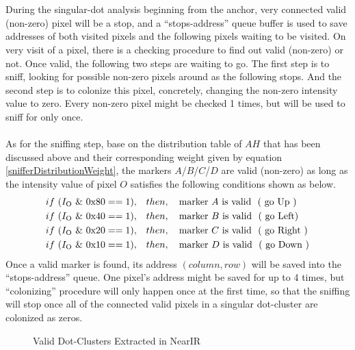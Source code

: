 \\\\%
During the singular-dot analysis beginning from the anchor, very connected valid (non-zero) pixel will be a stop, and a \enquote{stops-address} queue buffer is used to save addresses of both visited pixels and the following pixels waiting to be visited. On very visit of a pixel, there is a checking procedure to find out valid (non-zero) or not. Once valid, the following two steps are waiting to go. The first step is to sniff, looking for possible non-zero pixels around as the following stops. And the second step is to colonize this pixel, concretely, changing the non-zero intensity value to zero. Every non-zero pixel might be checked 1 times, but will be used to sniff for only once.%
\\\\%
As for the sniffing step, base on the distribution table of \(A\)\texttildelow \(H\) that has been discussed above and their corresponding weight given by equation \ref{snifferDistributionWeight}, the markers \(A\)/\(B\)/\(C\)/\(D\) are valid (non-zero) as long as the intensity value of pixel \(O\) satisfies the following conditions shown as below.%
%
\begin{equation}
%
\begin{aligned}
if \,\, ( I_{\text{O}} \,\, \& \,\, \text{0x80}  == 1 ),\quad &then, \quad \text{marker } A\,\, \text{is valid \,\,( go Up )}%
\\%
if \,\, ( I_{\text{O}} \,\, \& \,\, \text{0x40}  == 1 ),\quad &then, \quad \text{marker } B\,\, \text{is valid \,\,( go  Left)}%
\\%
if \,\, ( I_{\text{O}} \,\, \& \,\, \text{0x20}  == 1 ),\quad &then, \quad \text{marker } C\,\,\text{is valid \,\,( go Right )}%
\\%
if \,\, ( I_{\text{O}} \,\, \& \,\, \text{0x10}  == 1 ),\quad &then,\quad \text{marker } D\,\,\text{is valid \,\,( go Down )}%
\\%
\end{aligned}
%
\end{equation}%
%
Once a valid marker is found, its address \((column, row)\) will be saved into the \enquote{stops-address} queue. One pixel's address might be saved for up to 4 times, but \enquote{colonizing} procedure will only happen once at the first time, so that the sniffing will stop once all of the connected valid pixels in a singular dot-cluster are colonized as zeros.%
\par%
%
 \begin{figure}[t]
\hspace*{-0.5cm}
\centering
{}
{}
%
\caption{Valid Dot-Clusters Extracted in NearIR}
\label{DotCentersExtraction}
\end{figure}
